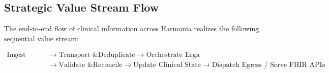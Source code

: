 \subsection{Strategic Value Stream Flow}

The end-to-end flow of clinical information across Harmonia realizes the following sequential value stream:

\begin{equation*}
\begin{aligned}
\text{Ingest Trigger}
&\longrightarrow \text{Transport \& Deduplicate}
\longrightarrow \text{Orchestrate Erga} \\
&\longrightarrow \text{Validate \& Reconcile}
\longrightarrow \text{Update Clinical State}
\longrightarrow \text{Dispatch Egress / Serve FHIR APIs}
\end{aligned}
\end{equation*}

\newpage
